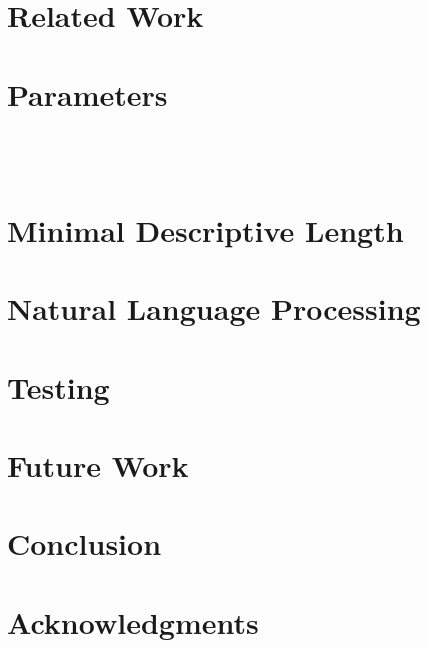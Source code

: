 \documentclass{acm_proc_article-sp}
\begin{document}
\section{Related Work}


\section{Parameters}
\\\\

\section{Minimal Descriptive Length}


\section{Natural Language Processing}


\section{Testing}


\section{Future Work}


\section{Conclusion}


\section{Acknowledgments}


%

%
%

\balancecolumns
\end{document}
